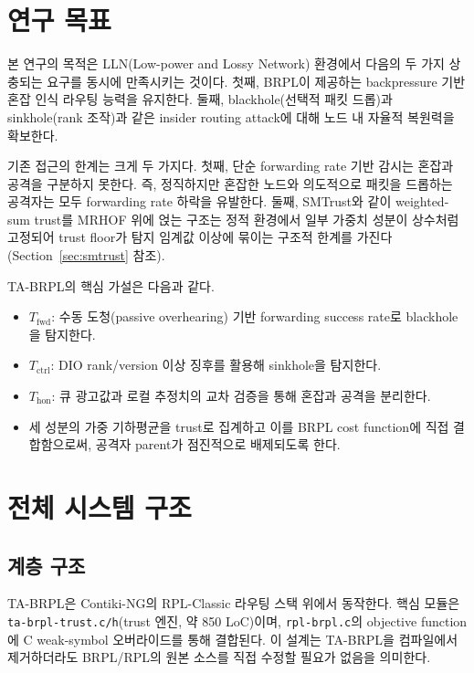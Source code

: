 \documentclass[12pt,a4paper]{article}
\begin{document}
\section{연구 목표}

본 연구의 목적은 LLN(Low-power and Lossy Network) 환경에서 다음의 두 가지 상충되는 요구를
동시에 만족시키는 것이다. 첫째, BRPL이 제공하는 backpressure 기반 혼잡 인식 라우팅
능력을 유지한다. 둘째, blackhole(선택적 패킷 드롭)과 sinkhole(rank 조작)과 같은
insider routing attack에 대해 노드 내 자율적 복원력을 확보한다.

기존 접근의 한계는 크게 두 가지다. 첫째, 단순 forwarding rate 기반 감시는
혼잡과 공격을 구분하지 못한다. 즉, 정직하지만 혼잡한 노드와 의도적으로 패킷을
드롭하는 공격자는 모두 forwarding rate 하락을 유발한다. 둘째, SMTrust와 같이
weighted-sum trust를 MRHOF 위에 얹는 구조는 정적 환경에서 일부 가중치 성분이
상수처럼 고정되어 trust floor가 탐지 임계값 이상에 묶이는 구조적 한계를 가진다
(Section~\ref{sec:smtrust} 참조).

TA-BRPL의 핵심 가설은 다음과 같다.
\begin{itemize}
  \item $T_\text{fwd}$: 수동 도청(passive overhearing) 기반 forwarding success rate로 blackhole을 탐지한다.
  \item $T_\text{ctrl}$: DIO rank/version 이상 징후를 활용해 sinkhole을 탐지한다.
  \item $T_\text{hon}$: 큐 광고값과 로컬 추정치의 교차 검증을 통해 혼잡과 공격을 분리한다.
  \item 세 성분의 가중 기하평균을 trust로 집계하고 이를 BRPL cost function에 직접 결합함으로써,
  공격자 parent가 점진적으로 배제되도록 한다.
\end{itemize}

\section{전체 시스템 구조}

\subsection{계층 구조}

TA-BRPL은 Contiki-NG의 RPL-Classic 라우팅 스택 위에서 동작한다.
핵심 모듈은 \texttt{ta-brpl-trust.c/h}(trust 엔진, 약 850 LoC)이며,
\texttt{rpl-brpl.c}의 objective function에 C weak-symbol 오버라이드를 통해
결합된다. 이 설계는 TA-BRPL을 컴파일에서 제거하더라도 BRPL/RPL의
원본 소스를 직접 수정할 필요가 없음을 의미한다.
\end{document}
